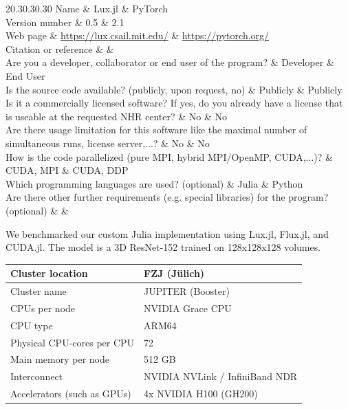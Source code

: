 \documentclass[new,showhints]{nhrproposal}
\begin{document}
\ComputeResources
\CodeOverview
\begin{Codetable}{2}{0.3\linewidth}{0.3\linewidth}{0.3\linewidth}{0} %
 Name           & Lux.jl & PyTorch \\ \hline
 Version number & 0.5 & 2.1 \\ \hline
 Web page       & \url{https://lux.csail.mit.edu/} & \url{https://pytorch.org/}  \\ \hline
 Citation or reference &  &  \\ \hline
 Are you a developer, collaborator or end user of the program? & Developer & End User \\ \hline
 Is the source code available? (publicly, upon request, no) & Publicly & Publicly \\ \hline
 Is it a commercially licensed software? If yes, do you already have a license that is useable at the requested NHR center?  & No & No \\ \hline
 Are there usage limitation for this software like the maximal number of simultaneous runs, license server,...?  & No & No \\ \hline
 How is the code parallelized (pure MPI, hybrid MPI/OpenMP, CUDA,...)? & CUDA, MPI & CUDA, DDP \\ \hline
 Which programming languages are used? (optional) & Julia & Python \\ \hline
 Are there other further requirements (e.g. special libraries) for the program? (optional) &  &  \\ \hline
\end{Codetable}

\CodeBenchmarks
{}
\BenchmarkDescription
We benchmarked our custom Julia implementation using Lux.jl, Flux.jl, and CUDA.jl. The model is a 3D ResNet-152 trained on 128x128x128 volumes.

\BenchmarkSystem
\begin{center}
\begin{tabular}{|G{5cm}|L{10cm}|}\hline
Cluster location & FZJ (Jülich) \\ \hline
Cluster name & JUPITER (Booster) \\ \hline
CPUs per node & NVIDIA Grace CPU \\ \hline
CPU type & ARM64 \\ \hline
Physical CPU-cores per CPU & 72 \\ \hline
Main memory per node & 512 GB \\ \hline
Interconnect & NVIDIA NVLink / InfiniBand NDR \\ \hline
Accelerators (such as GPUs) & 4x NVIDIA H100 (GH200) \\ \hline
\end{tabular}
\end{center}
\end{document}
